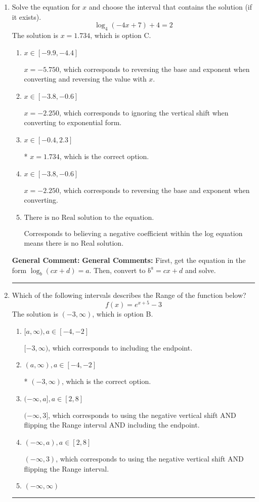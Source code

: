 \documentclass{extbook}[14pt]
\newcommand{\litem}[1]{\item #1

\rule{\textwidth}{0.4pt}}
\begin{document}
\begin{enumerate}\litem{
Solve the equation for $x$ and choose the interval that contains the solution (if it exists).
\[ \log_{4}{(-4x+7)}+4 = 2 \]
The solution is \( x = 1.734 \), which is option C.\begin{enumerate}[label=\Alph*.]
\item \( x \in [-9.9, -4.4] \)

$x = -5.750$, which corresponds to reversing the base and exponent when converting and reversing the value with $x$.
\item \( x \in [-3.8, -0.6] \)

$x = -2.250$, which corresponds to ignoring the vertical shift when converting to exponential form.
\item \( x \in [-0.4, 2.3] \)

* $x = 1.734$, which is the correct option.
\item \( x \in [-3.8, -0.6] \)

$x = -2.250$, which corresponds to reversing the base and exponent when converting.
\item \( \text{There is no Real solution to the equation.} \)

Corresponds to believing a negative coefficient within the log equation means there is no Real solution.
\end{enumerate}

\textbf{General Comment:} \textbf{General Comments:} First, get the equation in the form $\log_b{(cx+d)} = a$. Then, convert to $b^a = cx+d$ and solve.
}
\litem{
Which of the following intervals describes the Range of the function below?
\[ f(x) = e^{x+5}-3 \]
The solution is \( (-3, \infty) \), which is option B.\begin{enumerate}[label=\Alph*.]
\item \( [a, \infty), a \in [-4, -2] \)

$[-3, \infty)$, which corresponds to including the endpoint.
\item \( (a, \infty), a \in [-4, -2] \)

* $(-3, \infty)$, which is the correct option.
\item \( (-\infty, a], a \in [2, 8] \)

$(-\infty, 3]$, which corresponds to using the negative vertical shift AND flipping the Range interval AND including the endpoint.
\item \( (-\infty, a), a \in [2, 8] \)

$(-\infty, 3)$, which corresponds to using the negative vertical shift AND flipping the Range interval.
\item \( (-\infty, \infty) \)


\end{enumerate}}
\end{enumerate}
\end{document}

